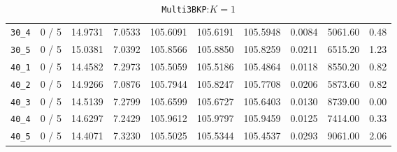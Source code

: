 \begin{table}[h!]
\begin{center}
\begin{tabular}{| c | c | c | c | c | c | c | c | c | c |}
\verb|30_4| & 0 / 5 & 14.9731 & 7.0533 & 105.6091 & 105.6191 & 105.5948 & 0.0084 & 5061.60 & 0.48\\ 
\verb|30_5| & 0 / 5 & 15.0381 & 7.0392 & 105.8566 & 105.8850 & 105.8259 & 0.0211 & 6515.20 & 1.23\\ 
\verb|40_1| & 0 / 5 & 14.4582 & 7.2973 & 105.5059 & 105.5186 & 105.4864 & 0.0118 & 8550.20 & 0.82\\ 
\verb|40_2| & 0 / 5 & 14.9266 & 7.0876 & 105.7944 & 105.8247 & 105.7708 & 0.0206 & 5873.60 & 0.82\\ 
\verb|40_3| & 0 / 5 & 14.5139 & 7.2799 & 105.6599 & 105.6727 & 105.6403 & 0.0130 & 8739.00 & 0.00\\ 
\verb|40_4| & 0 / 5 & 14.6297 & 7.2429 & 105.9612 & 105.9797 & 105.9459 & 0.0125 & 7414.00 & 0.33\\ 
\verb|40_5| & 0 / 5 & 14.4071 & 7.3230 & 105.5025 & 105.5344 & 105.4537 & 0.0293 & 9061.00 & 2.06\\ 
\hline
\end{tabular}
\caption{\texttt{Multi3BKP}:$K=1$}
\label{table:multi:1}
\end{center}
\end{table}


